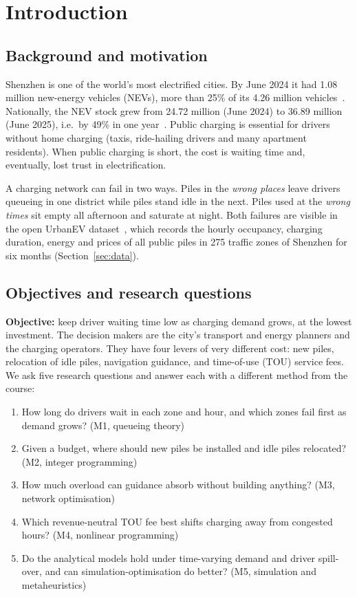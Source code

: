 \documentclass[11pt,a4paper]{article}
\begin{document}
\section{Introduction}
\subsection{Background and motivation}
Shenzhen is one of the world's most electrified cities. By June 2024 it had 1.08 million new-energy vehicles (NEVs), more than 25\% of its 4.26 million vehicles~\cite{cnev2024}. Nationally, the NEV stock grew from 24.72 million (June 2024) to 36.89 million (June 2025), i.e.\ by 49\% in one year~\cite{cnev2025}. Public charging is essential for drivers without home charging (taxis, ride-hailing drivers and many apartment residents). When public charging is short, the cost is waiting time and, eventually, lost trust in electrification.

A charging network can fail in two ways. Piles in the \emph{wrong places} leave drivers queueing in one district while piles stand idle in the next. Piles used at the \emph{wrong times} sit empty all afternoon and saturate at night. Both failures are visible in the open UrbanEV dataset~\cite{li2025urbanev}, which records the hourly occupancy, charging duration, energy and prices of all public piles in 275 traffic zones of Shenzhen for six months (Section~\ref{sec:data}).

\subsection{Objectives and research questions}
\textbf{Objective:} keep driver waiting time low as charging demand grows, at the lowest investment. The decision makers are the city's transport and energy planners and the charging operators. They have four levers of very different cost: new piles, relocation of idle piles, navigation guidance, and time-of-use (TOU) service fees. We ask five research questions and answer each with a different method from the course:
\begin{enumerate}[label=\textbf{RQ\arabic*},leftmargin=2.8em,itemsep=1pt]
\item How long do drivers wait in each zone and hour, and which zones fail first as demand grows? (M1, queueing theory)
\item Given a budget, where should new piles be installed and idle piles relocated? (M2, integer programming)
\item How much overload can guidance absorb without building anything? (M3, network optimisation)
\item Which revenue-neutral TOU fee best shifts charging away from congested hours? (M4, nonlinear programming)
\item Do the analytical models hold under time-varying demand and driver spill-over, and can simulation-optimisation do better? (M5, simulation and metaheuristics)
\end{enumerate}
\end{document}
